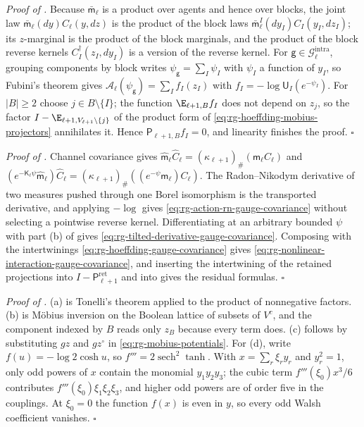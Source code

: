 \noindent\emph{Proof of .}
Because $\bar{\mathsf m}_\ell$ is a product over agents and hence over blocks, the
joint law $\bar{\mathsf m}_\ell(dy)C_\ell(y,dz)$ is the product of the block laws
$\bar{\mathsf m}_\ell^{I}(dy_I)C_I(y_I,dz_I)$; its $z$-marginal is the product of
the block marginals, and the product of the block reverse kernels
$C_I^\dagger(z_I,dy_I)$ is a version of the reverse kernel. For $\mathsf
g\in\mathcal G_\ell^{\mathrm{intra}}$, grouping components by block writes
$\psi_{\mathsf g}=\sum_I\psi_I$ with $\psi_I$ a function of $y_I$, so Fubini's
theorem gives $\mathcal A_\ell(\psi_{\mathsf g})=\sum_If_I(z_I)$ with
$f_I=-\log\mathsf U_I(e^{-\psi_I})$. For $\lvert B\rvert\ge2$ choose
$j\in B\setminus\{I\}$; the function $\E_{\ell+1,B}f_I$ does not depend on
$z_j$, so the factor $I-\E_{\ell+1,V_{\ell+1}\setminus\{j\}}$ of the product
form of \eqref{eq:rg-hoeffding-mobius-projectors} annihilates it. Hence
$\mathsf P_{\ell+1,B}f_I=0$, and linearity finishes the proof. $\square$

\noindent\emph{Proof of .}
Channel covariance gives $\widehat{\mathsf m}_\ell\widehat
C_\ell=(\kappa_{\ell+1})_\#(\mathsf m_\ell C_\ell)$ and
$(e^{-\mathsf K_\ell\psi}\widehat{\mathsf m}_\ell)\widehat
C_\ell=(\kappa_{\ell+1})_\#((e^{-\psi}\mathsf m_\ell)C_\ell)$. The Radon--Nikodym
derivative of two measures pushed through one Borel isomorphism is the transported
derivative, and applying $-\log$ gives \eqref{eq:rg-action-rn-gauge-covariance}
without selecting a pointwise reverse kernel. Differentiating at an arbitrary
bounded $\psi$ with part (b) of  gives
\eqref{eq:rg-tilted-derivative-gauge-covariance}. Composing with the intertwinings
\eqref{eq:rg-hoeffding-gauge-covariance} gives
\eqref{eq:rg-nonlinear-interaction-gauge-covariance}, and inserting the intertwining
of the retained projections into $I-\mathsf P^{\mathrm{ret}}_{\ell+1}$ and into
 gives the residual formulas. $\square$

\noindent\emph{Proof of .}
(a) is Tonelli's theorem applied to the product of nonnegative factors. (b) is
M\"obius inversion on the Boolean lattice of subsets of $V^c$, and the component
indexed by $B$ reads only $z_B$ because every term does. (c) follows by
substituting $gz$ and $gz^\circ$ in \eqref{eq:rg-mobius-potentials}. For (d), write
$f(u)=-\log2\cosh u$, so $f'''=2\operatorname{sech}^2\tanh$. With
$x=\sum_r\xi_ry_r$ and $y_r^2=1$, only odd powers of $x$ contain the monomial
$y_1y_2y_3$; the cubic term $f'''(\xi_0)x^3/6$ contributes
$f'''(\xi_0)\xi_1\xi_2\xi_3$, and higher odd powers are of order five in the
couplings. At $\xi_0=0$ the function $f(x)$ is even in $y$, so every odd Walsh
coefficient vanishes. $\square$

